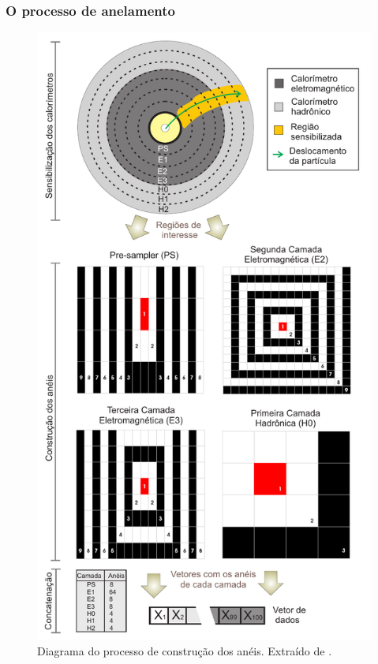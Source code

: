 \subsubsection{O processo de anelamento}
\label{sssec:anelamento}

\begin{figure}[hp!]
\label{fig:cons_aneis}
\centering
\includegraphics[height=0.9\textheight]{imagens/cons_aneis.pdf}
\caption[Diagrama do processo de construção dos anéis.]
{Diagrama do processo de construção dos anéis. Extraído de \cite{tese_eduardo}.}
\end{figure}

